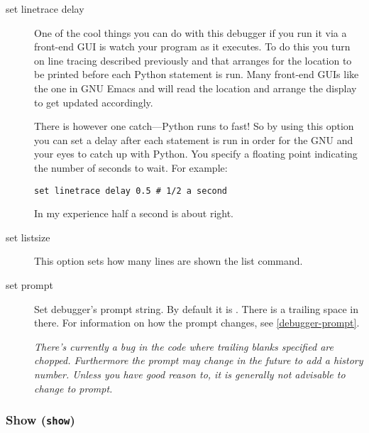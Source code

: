 \begin{description}
\item[set linetrace delay ]

One of the cool things you can do with this debugger if you run it via
a front-end GUI is watch your program as it executes. To do this you
turn on line tracing described previously  and
that arranges for the location to be printed before each Python
statement is run. Many front-end GUIs like the one in GNU Emacs and
 will read the location and arrange the display to get
updated accordingly. 

There is however one catch---Python runs to fast! So by using this
option you can set a delay after each statement is run in order for
the GNU and your eyes to catch up with Python. You specify a floating
point indicating the number of seconds to wait. For example: 

\begin{verbatim}
set linetrace delay 0.5 # 1/2 a second
\end{verbatim}

In my experience half a second is about right.

\item[set listsize ]

This option sets how many lines are shown the list command.

\item[set prompt ]\label{command:prompt}

Set debugger's prompt string. By default it is . There
is a trailing space in there. For information on how the prompt
changes, see \ref{debugger-prompt}.

\emph{There's currently a bug in the code where trailing blanks
specified are chopped. Furthermore the prompt may change in the future
to add a history number. Unless you have good reason to, it is
generally not advisable to change to prompt.}

\end{description}

\subsubsection{Show ({\tt show})\label{subsubsection:show}}

